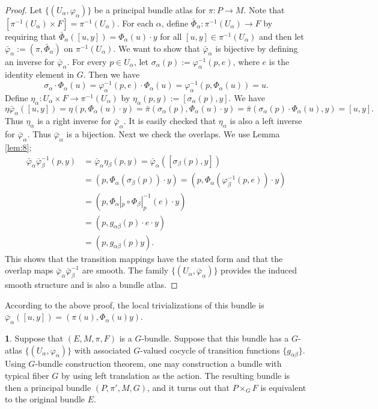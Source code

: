 \documentclass[11pt]{article}
\theoremstyle{definition}
\newtheorem{para}{}[part]
\begin{document}
\begin{proof}
	Let $\{(U_\alpha,\varphi_\alpha)\}$ be a principal bundle atlas for $\pi:P\to M$. Note that $[\pi^{-1}(U_\alpha)\times F]=\pi^{-1}(U_\alpha)$. For each $\alpha$, define $\bar{\Phi}_\alpha:\pi^{-1}(U_\alpha)\to F$ by requiring that $\bar{\Phi}_\alpha([u,y])=\Phi_\alpha(u)\cdot y$ for all $[u,y]\in \pi^{-1}(U_\alpha)$ and then let $\bar{\varphi}_\alpha:=(\pi,\bar{\Phi}_\alpha)$ on $\pi^{-1}(U_\alpha)$. We want to show that $\bar{\varphi}_\alpha$ is bijective by defining an inverse for $\bar{\varphi}_\alpha$. For every $p\in U_\alpha$, let $\sigma_\alpha(p):=\varphi_\alpha^{-1}(p,e)$, where $e$ is the identity element in $G$. Then we have
	\[
	\sigma_\alpha \cdot \Phi_\alpha(u)=\varphi_\alpha^{-1}(p,e)\cdot \Phi_\alpha(u)=\varphi_\alpha^{-1}(p,\Phi_\alpha(u))=u.
	\]
	Define $\eta_\alpha:U_\alpha\times F\to \pi^{-1}(U_\alpha)$ by $\eta_{\alpha}(p,y):=[\sigma_\alpha(p),y]$. We have
	\[
	\eta\bar{\varphi}_\alpha([u,y])=\eta(p,\Phi_\alpha(u)\cdot y)=\bar{\pi}(\sigma_\alpha(p),\Phi_\alpha(u)\cdot y)=\bar{\pi}(\sigma_\alpha(p)\cdot \Phi_\alpha(u),y)=[u,y].
	\]
	Thus $\eta_\alpha$ is a right inverse for $\bar{\varphi}_{\alpha}$. It is easily checked that $\eta_\alpha$ is also a left inverse for $\bar{\varphi}_{\alpha}$. Thus $\bar{\varphi}_\alpha$ is a bijection. Next we check the overlaps. We use Lemma \ref{lem:8};
	\[
	\begin{aligned}
	\bar{\varphi}_{\alpha}\bar{\varphi}_{\beta}^{-1}(p,y)&=\bar{\varphi}_{\alpha}\eta_\beta(p,y)=\bar{\varphi}_{\alpha}([\sigma_\beta(p),y])\\
	&=(p,\Phi_\alpha(\sigma_\beta(p))\cdot y)=(p,\Phi_\alpha(\varphi_\beta^{-1}(p,e))\cdot y)\\
	&=(p,\Phi_\alpha|_p\circ \Phi_\beta|_p^{-1}(e)\cdot y)\\
	&=(p,g_{\alpha\beta}(p)\cdot e\cdot y)\\
	&=(p,g_{\alpha\beta}(p)y).
	\end{aligned}
	\]
	This shows that the transition mappings  have the stated form and that the overlap maps $\bar{\varphi}_{\alpha}\bar{\varphi}_{\beta}^{-1}$ are smooth. The family $\{(U_\alpha,\bar{\varphi}_\alpha)\}$ provides the induced smooth structure and is also a bundle atlas.
\end{proof}

According to the above proof, the local trivializations of this bundle is $\bar{\varphi}_\alpha([u,y])=(\pi(u),\Phi_\alpha(u)y)$.

\begin{para}
	Suppose that $(E,M,\pi,F)$ is a $G$-bundle. Suppose that this bundle has a $G$-atlas $\{(U_\alpha,\varphi_\alpha)\}$ with associated $G$-valued cocycle of transition functions $\{g_{\alpha\beta}\}$. Using $G$-bundle construction theorem, one may construction a bundle with typical fiber $G$ by using left translation as the action. The resulting bundle is then a principal bundle $(P,\pi',M,G)$, and it turns out that $P\times_G F$ is equivalent to the original bundle $E$.
\end{para}
\end{document}
